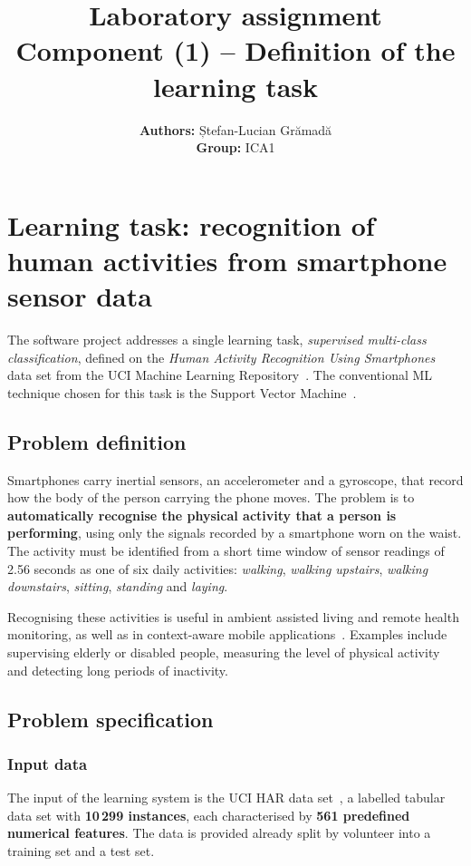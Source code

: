 \documentclass[a4paper, 11pt]{article}
\title{\textbf{Laboratory assignment} \\[1ex] \large \textbf{Component} (1) -- Definition of the learning task}
\author{\textbf{Authors:} Ștefan-Lucian Grămadă\\ \textbf{Group:} ICA1}
\begin{document}
\maketitle

\section{Learning task: recognition of human activities from smartphone sensor data}

The software project addresses a single learning task, \emph{supervised multi-class classification}, defined on the \emph{Human Activity Recognition Using Smartphones} data set from the UCI Machine Learning Repository~\cite{anguita2013}. The conventional ML technique chosen for this task is the Support Vector Machine~\cite{cortes1995}.

\subsection{Problem definition}

Smartphones carry inertial sensors, an accelerometer and a gyroscope, that record how the body of the person carrying the phone moves. The problem is to \textbf{automatically recognise the physical activity that a person is performing}, using only the signals recorded by a smartphone worn on the waist. The activity must be identified from a short time window of sensor readings of 2.56 seconds as one of six daily activities: \emph{walking}, \emph{walking upstairs}, \emph{walking downstairs}, \emph{sitting}, \emph{standing} and \emph{laying}.

Recognising these activities is useful in ambient assisted living and remote health monitoring, as well as in context-aware mobile applications~\cite{anguita2012}. Examples include supervising elderly or disabled people, measuring the level of physical activity and detecting long periods of inactivity.

\subsection{Problem specification}

\subsubsection{Input data}

The input of the learning system is the UCI HAR data set~\cite{anguita2013}, a labelled tabular data set with \textbf{10\,299 instances}, each characterised by \textbf{561 predefined numerical features}. The data is provided already split by volunteer into a training set and a test set.
\end{document}
